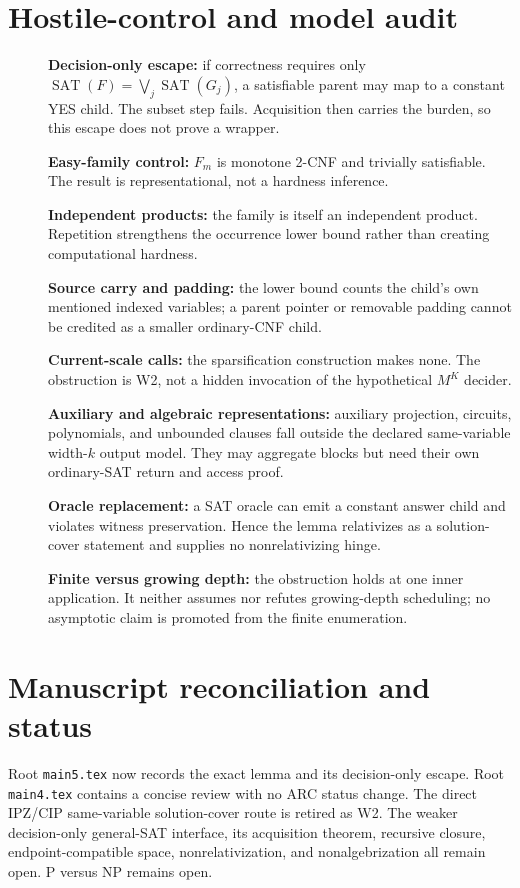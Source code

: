 \documentclass[11pt]{article}
\begin{document}
\section{Hostile-control and model audit}
\begin{description}
\item[] \textbf{Decision-only escape:} if correctness requires only
$\operatorname{SAT}(F)=\bigvee_j\operatorname{SAT}(G_j)$, a satisfiable
parent may map to a constant YES child.  The subset step fails.  Acquisition
then carries the burden, so this escape does not prove a wrapper.
\item[] \textbf{Easy-family control:} $F_m$ is monotone 2-CNF and trivially
satisfiable.  The result is representational, not a hardness inference.
\item[] \textbf{Independent products:} the family is itself an independent
product.  Repetition strengthens the occurrence lower bound rather than
creating computational hardness.
\item[] \textbf{Source carry and padding:} the lower bound counts the child's
own mentioned indexed variables; a parent pointer or removable padding cannot
be credited as a smaller ordinary-CNF child.
\item[] \textbf{Current-scale calls:} the sparsification construction makes
none.  The obstruction is W2, not a hidden invocation of the hypothetical
$M^K$ decider.
\item[] \textbf{Auxiliary and algebraic representations:} auxiliary
projection, circuits, polynomials, and unbounded clauses fall outside the
declared same-variable width-$k$ output model.  They may aggregate blocks but
need their own ordinary-SAT return and access proof.
\item[] \textbf{Oracle replacement:} a SAT oracle can emit a constant answer
child and violates witness preservation.  Hence the lemma relativizes as a
solution-cover statement and supplies no nonrelativizing hinge.
\item[] \textbf{Finite versus growing depth:} the obstruction holds at one
inner application.  It neither assumes nor refutes growing-depth scheduling;
no asymptotic claim is promoted from the finite enumeration.
\end{description}

\section{Manuscript reconciliation and status}
Root \texttt{main5.tex} now records the exact lemma and its decision-only
escape.  Root \texttt{main4.tex} contains a concise review with no ARC status
change.  The direct IPZ/CIP same-variable solution-cover route is retired as
W2.  The weaker decision-only general-SAT interface, its acquisition theorem,
recursive closure, endpoint-compatible space, nonrelativization, and
nonalgebrization all remain open.  P versus NP remains open.
\end{document}
